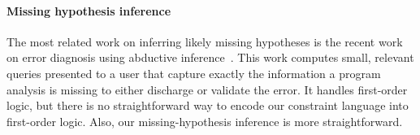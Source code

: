 \paragraph{Missing hypothesis inference}

The most related work on inferring likely missing hypotheses is the
recent work on error diagnosis using abductive
inference~\cite{dillig:pldi12}. This work computes small, relevant
queries presented to a user that capture exactly the information a
program analysis is missing to either discharge or validate the error.
It handles first-order logic, but there is no straightforward
way to encode our constraint language into first-order logic.
Also, our missing-hypothesis inference is more straightforward.






